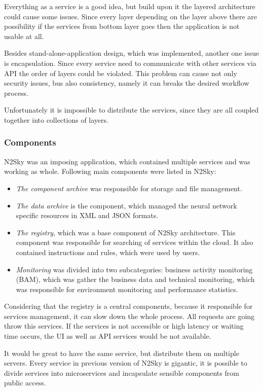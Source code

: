 Everything as a service is a good idea, but build upon it the layered architecture could cause some issues. Since every layer depending on the layer above there are possibility if the services from bottom layer goes then the application is not usable at all. 

Besides stand-alone-application design, which was implemented, another one issue is encapsulation. Since every service need to communicate with other services via API the order of layers could be violated. This problem can cause not only security issues, bus also consistency, namely it can breaks the desired workflow process.

Unfortunately it is impossible to distribute the services, since they are all coupled together into collections of layers.  

\subsubsection{Components}\label{Components}

N2Sky was an imposing application, which contained multiple services and was working as whole. Following main components were listed in N2Sky:

\begin{itemize}
\item \emph{The component archive} was responsible for storage and file management.
\item \emph{The data archive} is the component, which managed the neural network specific resources in XML and JSON formats. 
\item \emph{The registry}, which was a base component of N2Sky architecture. This component was responsible for searching of services within the cloud.  It also contained instructions and rules, which were used by users. 
\item \emph{Monitoring} was divided into two subcategories: business activity monitoring (BAM), which was gather the business data and technical monitoring, which was responsible for environment monitoring and performance statistics. 
\end{itemize}

Considering that the registry is a central components, because it responsible for services management, it can slow down the whole process. All requests are going throw this services. If the services is not accessible or high latency or waiting time occurs, the UI as well as API services would be not available.

It would be great to have the same service, but distribute them on multiple servers. Every service in previous version of N2Sky is  gigantic, it is possible to divide services into microservices and incapsulate sensible components from public access.


